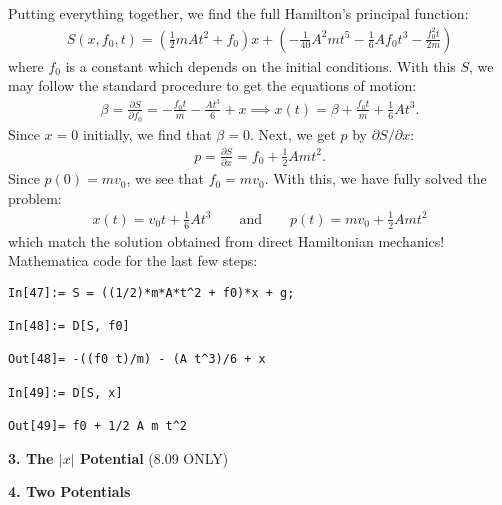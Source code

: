 \documentclass{article}
\theoremstyle{definition}
\newcommand{\p}{\partial}
\newcommand{\be}{\beta}
\newcommand{\f}[2]{\frac{#1}{#2}}
\newcommand{\lp}{\left(}
\newcommand{\rp}{\right)}
\begin{document}
Putting everything together, we find the full Hamilton's principal function:
\begin{align*}
\boxed{S(x,f_0,t) = \lp \f{1}{2}m A t^2 + f_0 \rp x + \lp -\f{1}{40}A^2 mt^5 - \f{1}{6}A f_0 t^3 - \f{f_0^2 t}{2m}  \rp }
\end{align*}
where $f_0$ is a constant which depends on the initial conditions. With this $S$, we may follow the standard procedure to get the equations of motion:
\begin{align*}
\be = \f{\p S}{\p f_0} = -\f{f_0 t}{m} - \f{A t^3}{6} + x \implies x(t) = \be + \f{f_0 t}{m} + \f{1}{6} At^3.
\end{align*}
Since $x=0$ initially, we find that  $\be = 0$. Next, we get $p$ by $\p S/\p x$:
\begin{align*}
p = \f{\p S}{\p x} = f_0+ \f{1}{2}Amt^2.
\end{align*}
Since $p(0) = mv_0$, we see that $f_0 = mv_0$. With this, we have fully solved the problem:
\begin{align*}
\boxed{x(t) = v_0 t + \f{1}{6}A t^3} \quad\quad \text{and} \quad\quad \boxed{p(t) = mv_0  + \f{1}{2}Amt^2}
\end{align*}
which match the solution obtained from direct Hamiltonian mechanics!\\




Mathematica code for the last few steps:
\begin{lstlisting}
In[47]:= S = ((1/2)*m*A*t^2 + f0)*x + g;

In[48]:= D[S, f0]

Out[48]= -((f0 t)/m) - (A t^3)/6 + x

In[49]:= D[S, x]

Out[49]= f0 + 1/2 A m t^2
\end{lstlisting}






\noindent \textbf{3. The $|x|$ Potential} (8.09 ONLY)


\noindent \textbf{4. Two Potentials}
\end{document}
